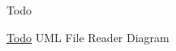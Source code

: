 \begin{DoxyRefDesc}{Todo}
\item[\hyperlink{todo__todo000002}{Todo}]U\-M\-L File Reader Diagram\end{DoxyRefDesc}
